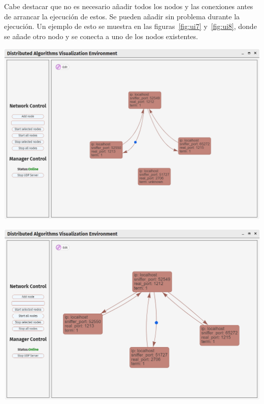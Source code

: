 Cabe destacar que no es necesario añadir todos los nodos y las conexiones antes de arrancar la ejecución de estos. Se pueden añadir sin problema durante la ejecución. Un ejemplo de esto se muestra en las figuras~\ref{fig:ui7} y~\ref{fig:ui8}, donde se añade otro nodo y se conecta a uno de los nodos existentes.

{
\centering
\includegraphics[width=0.9\linewidth]{imagenes/ui7}
\label{fig:ui7}
}

{
\centering
\includegraphics[width=0.9\linewidth]{imagenes/ui8}
\label{fig:ui8}
}

